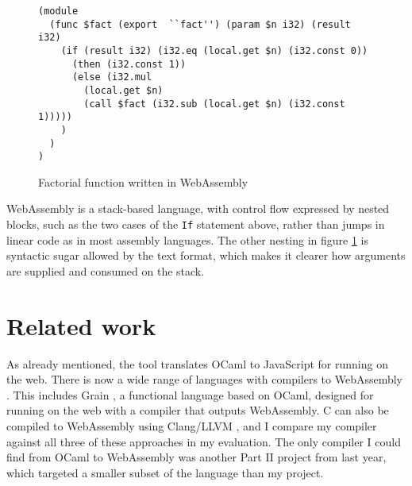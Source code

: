 \begin{figure}[H]
\begin{verbatim}
(module
  (func $fact (export  ``fact'') (param $n i32) (result i32)
    (if (result i32) (i32.eq (local.get $n) (i32.const 0))
      (then (i32.const 1))
      (else (i32.mul 
        (local.get $n) 
        (call $fact (i32.sub (local.get $n) (i32.const 1)))))
    )
  )
)
\end{verbatim}
\caption{Factorial function written in WebAssembly} 
\label{fig:wasm}
\end{figure}

WebAssembly is a stack-based language, with control flow expressed by nested blocks, such as the two cases of the \verb|If| statement above, rather than jumps in linear code as in most assembly languages. The other nesting in figure \ref{fig:wasm} is syntactic sugar allowed by the text format, which makes it clearer how arguments are supplied and consumed on the stack.


\section{Related work}
As already mentioned, the  \jsofocaml{} tool translates OCaml to JavaScript for running on the web. There is now a wide range of languages with compilers to WebAssembly \cite{langauges-to-wasm}. This includes Grain \cite{grain}, a functional language based on OCaml, designed for running on the web with a compiler that outputs WebAssembly. C can also be compiled to WebAssembly using Clang/LLVM \cite{clang-llvm}, and I compare my compiler against all three of these approaches in my evaluation.
The only compiler I could find from OCaml to WebAssembly was another Part II project from last year, which targeted a smaller subset of the language than my project.


